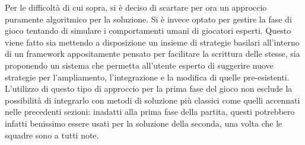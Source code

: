 Per le difficoltà di cui sopra, si è deciso di scartare per ora un approccio puramente algoritmico per la soluzione.
Si è invece optato per gestire la fase di gioco tentando di simulare i comportamenti umani di giocatori esperti.
Questo viene fatto sia mettendo a disposizione un insieme di strategie basilari all'interno di un framework appositamente pensato per facilitare la scrittura delle stesse, sia proponendo un sistema che permetta all'utente esperto di suggerire nuove strategie per l'ampliamento, l'integrazione e la modifica di quelle pre-esistenti.\\
L'utilizzo di questo tipo di approccio per la prima fase del gioco non esclude la possibilità di integrarlo con metodi di soluzione più classici come quelli accennati nelle precedenti sezioni: inadatti alla prima fase della partita, questi potrebbero infatti benissimo essere usati per la soluzione della seconda, una volta che le squadre sono a tutti note.
